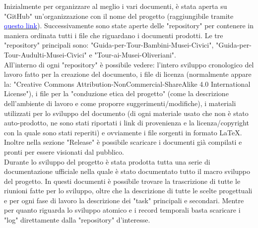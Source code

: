 \documentclass[hidelinks,12pt,a4paper]{article}
\begin{document}
\begin{flushleft}
		\bigskip
		Inizialmente per organizzare al meglio i vari documenti, è stata aperta su "GitHub" un'organizzazione con il nome del progetto (raggiungibile tramite \href{https://github.com/Pomodoro-Musei-di-Pesaro}{\textcolor{blue}{questo link}}). Successivamente sono state aperte delle "repository" per contenere in maniera ordinata tutti i file che riguardano i documenti prodotti. Le tre "repository" principali sono: "Guida-per-Tour-Bambini-Musei-Civici", "Guida-per-Tour-Audulti-Musei-Civici" e "Tour-ai-Musei-Oliveriani".\\
		All'interno di ogni "repository" è possibile vedere: l'intero sviluppo cronologico del lavoro fatto per la creazione del documento,  i file di licenza (normalmente appare la: "Creative Commons Attribution-NonCommercial-ShareAlike 4.0 International License"), i file per la "conduzione etica del progetto" (come la descrizione dell'ambiente di lavoro e come proporre suggerimenti/modifiche), i materiali utilizzati per lo sviluppo del documento (di ogni materiale usato che non è stato auto-prodotto, ne sono stati riportati i link di provenienza e la licenza/copyright con la quale sono stati reperiti) e ovviamente i file sorgenti in formato \LaTeX. Inoltre nella sezione "Release" è possibile scaricare i documenti già compilati e pronti per essere visionati dal pubblico.\\
		Durante lo sviluppo del progetto è stata prodotta tutta una serie di documentazione ufficiale nella quale è stato documentato tutto il macro sviluppo del progetto. In questi documenti è possibile trovare la trascrizione di tutte le riunioni fatte per lo sviluppo, oltre che la descrizione di tutte le scelte progettuali e per ogni fase di lavoro la descrizione dei "task" principali e secondari. Mentre per quanto riguarda lo sviluppo atomico e i record temporali basta scaricare i "log" direttamente dalla "repository" d'interesse.
		
		\newpage

\end{flushleft}
\end{document}
